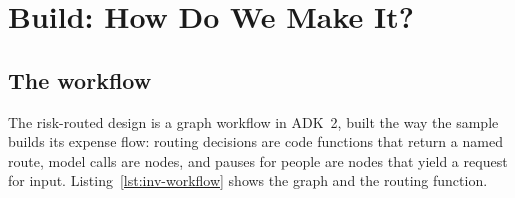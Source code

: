 
\section{Build: How Do We Make It?}
\label{sec:inv-build}

\subsection{The workflow}

The risk-routed design is a graph workflow in ADK~2, built the way the sample builds its expense flow: routing decisions are code functions that return a named route, model calls are nodes, and pauses for people are nodes that yield a request for input. Listing~\ref{lst:inv-workflow} shows the graph and the routing function.

